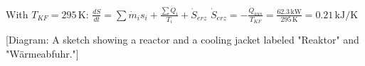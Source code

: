 With \( T_{KF} = 295 \, \text{K} \):  
\( \frac{dS}{dt} = \sum \dot{m}_i s_i + \frac{\sum \dot{Q}_i}{T_i} + \dot{S}_{erz} \)  
\( \dot{S}_{erz} = -\frac{\dot{Q}_{aus}}{T_{KF}} = \frac{62.3 \, \text{kW}}{295 \, \text{K}} = 0.21 \, \text{kJ/K} \)  

[Diagram: A sketch showing a reactor and a cooling jacket labeled "Reaktor" and "Wärmeabfuhr."]